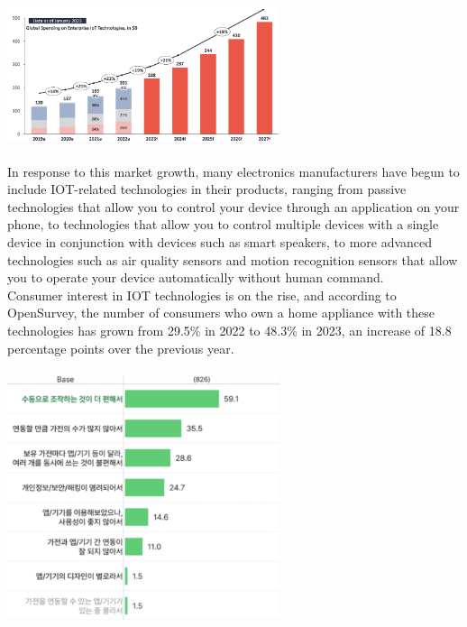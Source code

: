 \documentclass[11pt, conference]{IEEEtran}
\begin{document}
\includegraphics[width=8cm]{imgs/iot_market_growing.png}\\\\

In response to this market growth, many electronics manufacturers have begun to include IOT-related technologies in their products, ranging from passive technologies that allow you to control your device through an application on your phone, to technologies that allow you to control multiple devices with a single device in conjunction with devices such as smart speakers, to more advanced technologies such as air quality sensors and motion recognition sensors that allow you to operate your device automatically without human command. \\

Consumer interest in IOT technologies is on the rise, and according to OpenSurvey, the number of consumers who own a home appliance with these technologies has grown from 29.5\% in 2022 to 48.3\% in 2023, an increase of 18.8 percentage points over the previous year. \\\\

\includegraphics[width=8cm]{imgs/reason_why_not_use_iot.png}\\\\
\end{document}
